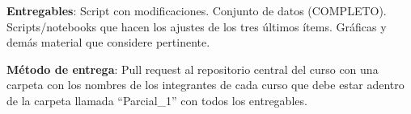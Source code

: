 \documentclass[10.5pt]{article}
\begin{document}
{\bf Entregables}: Script con modificaciones. Conjunto de datos (COMPLETO). Scripts/notebooks que hacen los ajustes de los tres \'{u}ltimos \'{i}tems. Gr\'{a}ficas y dem\'{a}s material que considere pertinente.

{\bf M\'{e}todo de entrega}: Pull request al repositorio central del curso con una carpeta con los nombres de los integrantes de cada curso que debe estar adentro de la carpeta llamada ``Parcial\_1'' con todos los entregables.
\end{document}
